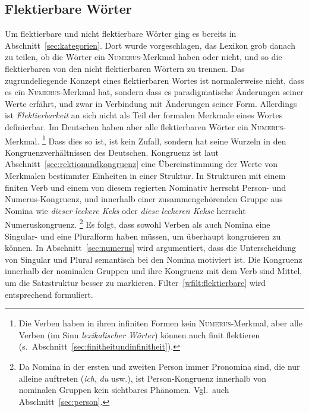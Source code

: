
\subsection{Flektierbare Wörter}
\label{sec:flektierbarewoerter}


Um flektierbare und nicht flektierbare Wörter ging es bereits in Abschnitt~\ref{sec:kategorien}.
Dort wurde vorgeschlagen, das Lexikon grob danach zu teilen, ob die Wörter ein \textsc{Numerus}-Merkmal haben oder nicht, und so die flektierbaren von den nicht flektierbaren Wörtern zu trennen.
Das zugrundeliegende Konzept eines flektierbaren Wortes ist normalerweise nicht, dass es ein \textsc{Numerus}-Merkmal hat, sondern dass es paradigmatische Änderungen seiner Werte erfährt, und zwar in Verbindung mit Änderungen seiner Form.
Allerdings ist \textit{Flektierbarkeit} an sich nicht als Teil der formalen Merkmale eines Wortes definierbar.
Im Deutschen haben aber alle flektierbaren Wörter ein \textsc{Numerus}-Merkmal.%
\footnote{Die Verben haben in ihren infiniten Formen kein \textsc{Numerus}-Merkmal, aber alle Verben (im Sinn \textit{lexikalischer Wörter}) können auch finit flektieren (s.\ Abschnitt~\ref{sec:finitheitundinfinitheit}).}
Dass dies so ist, ist kein Zufall, sondern hat seine Wurzeln in den Kongruenzverhältnissen des Deutschen.
Kongruenz ist laut Abschnitt~\ref{sec:rektionundkongruenz} eine Übereinstimmung der Werte von Merkmalen bestimmter Einheiten in einer Struktur.
In Strukturen mit einem finiten Verb und einem von diesem regierten Nominativ herrscht Person- und Numerus-Kongruenz, und innerhalb einer zusammengehörenden Gruppe aus Nomina wie \textit{dieser leckere Keks} oder \textit{diese leckeren Kekse} herrscht Numeruskongruenz.%
\footnote{Da Nomina in der ersten und zweiten Person immer Pronomina sind, die nur alleine auftreten (\textit{ich}, \textit{du} usw.), ist Person-Kongruenz innerhalb von nominalen Gruppen kein sichtbares Phänomen.
Vgl.\ auch Abschnitt~\ref{sec:person}.}
Es folgt, dass sowohl Verben als auch Nomina eine Singular- und eine Pluralform haben müssen, um überhaupt kongruieren zu können.
In Abschnitt~\ref{sec:numerus} wird argumentiert, dass die Unterscheidung von Singular und Plural semantisch bei den Nomina motiviert ist.
Die Kongruenz innerhalb der nominalen Gruppen und ihre Kongruenz mit dem Verb sind Mittel, um die Satzstruktur besser zu markieren.
Filter~\ref{wfilt:flektierbare} wird entsprechend formuliert.

